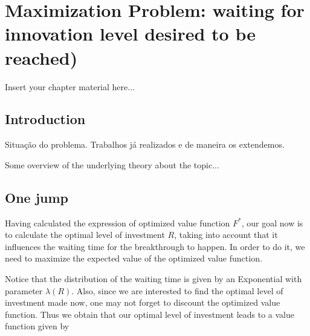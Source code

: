 
\chapter{Maximization Problem: waiting for innovation level desired to be reached)}
\label{chapter:background}

Insert your chapter material here...


\section{Introduction}
\label{section:overview}

Situação do problema.
Trabalhos já realizados e de maneira os extendemos.

Some overview of the underlying theory about the topic...


\section{One jump}
\label{section:max_1jump}

Having calculated the expression of optimized value function $F^*$, our goal now is to calculate the optimal level of investment $R$, taking into account that it influences the waiting time for the breakthrough to happen. In order to do it, we need to maximize the expected value of the optimized value function.

Notice that the distribution of the waiting time is given by an Exponential with parameter $\lambda(R)$. Also, since we are interested to find the optimal level of investment made now, one may not forget to discount the optimized value function.
Thus we obtain that our optimal level of investment leads to a value function given by 


